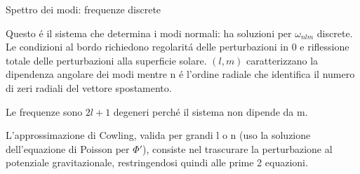 \documentclass[10pt,xcolor={usenames},fleqn,mathserif,serif]{beamer}
\begin{document}
\begin{wordonframe}{Spettro dei modi: frequenze discrete}

Questo \'e il sistema che determina i modi normali: ha soluzioni per $\omega_{nlm}$ discrete. Le condizioni al bordo richiedono regolarit\'a delle perturbazioni in 0 e riflessione totale delle perturbazioni alla superficie solare. $(l,m)$ caratterizzano la dipendenza angolare dei modi mentre n \'e l'ordine radiale che identifica il numero di zeri radiali del vettore spostamento.

Le frequenze sono $2l+1$ degeneri perch\'e il sistema non dipende da m.

L'approssimazione di Cowling, valida per grandi l o n (uso la soluzione dell'equazione di Poisson per $\Phi'$), consiste nel trascurare la perturbazione al potenziale gravitazionale, restringendosi quindi alle prime 2 equazioni.

\end{wordonframe}
\end{document}

